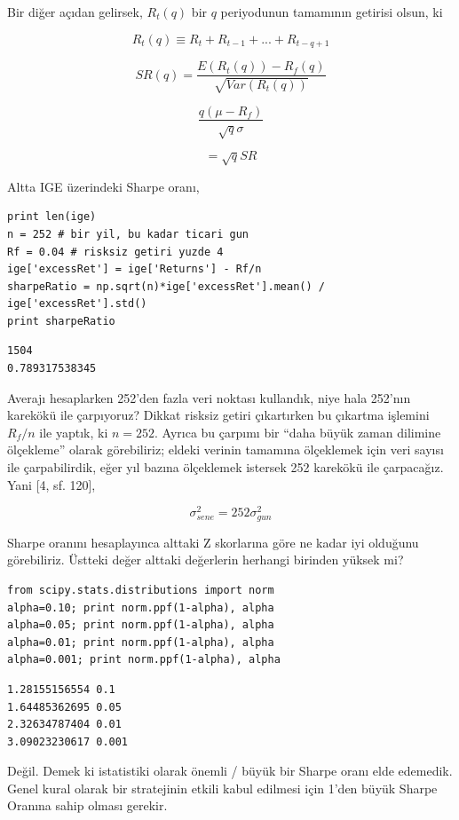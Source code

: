 \documentclass[12pt,fleqn]{article}\usepackage{../../common}
\begin{document}
Bir diğer açıdan gelirsek,  $R_t(q)$ bir $q$ periyodunun tamamının getirisi
olsun, ki

$$ R_t(q) \equiv R_t + R_{t-1} + ... + R_{t-q+1}  $$

$$ SR(q) = \frac{E(R_t(q)) - R_f(q)}{\sqrt{Var(R_t(q))}} $$

$$ \frac{q(\mu-R_f)}{\sqrt{q} \sigma} $$

$$ = \sqrt{q}SR $$

Altta IGE üzerindeki Sharpe oranı,

\begin{verbatim}
print len(ige)
n = 252 # bir yil, bu kadar ticari gun
Rf = 0.04 # risksiz getiri yuzde 4
ige['excessRet'] = ige['Returns'] - Rf/n
sharpeRatio = np.sqrt(n)*ige['excessRet'].mean() / ige['excessRet'].std()
print sharpeRatio
\end{verbatim}

\begin{verbatim}
1504
0.789317538345
\end{verbatim}

Averajı hesaplarken 252'den fazla veri noktası kullandık, niye hala 252'nın
karekökü ile çarpıyoruz? Dikkat risksiz getiri çıkartırken bu çıkartma
işlemini $R_f/n$ ile yaptık, ki $n=252$. Ayrıca bu çarpımı bir ``daha büyük
zaman dilimine ölçekleme'' olarak görebiliriz; eldeki verinin tamamına
ölçeklemek için veri sayısı ile çarpabilirdik, eğer yıl bazına ölçeklemek
istersek 252 karekökü ile çarpacağız. Yani [4, sf. 120], 

$$ \sigma_{sene}^2 = 252 \sigma_{gun}^2 $$

Sharpe oranını hesaplayınca alttaki Z skorlarına göre ne kadar iyi olduğunu
görebiliriz. Üstteki değer alttaki değerlerin herhangi birinden yüksek mi?

\begin{verbatim}
from scipy.stats.distributions import norm
alpha=0.10; print norm.ppf(1-alpha), alpha
alpha=0.05; print norm.ppf(1-alpha), alpha
alpha=0.01; print norm.ppf(1-alpha), alpha
alpha=0.001; print norm.ppf(1-alpha), alpha
\end{verbatim}

\begin{verbatim}
1.28155156554 0.1
1.64485362695 0.05
2.32634787404 0.01
3.09023230617 0.001
\end{verbatim}

Değil. Demek ki istatistiki olarak önemli / büyük bir Sharpe oranı elde
edemedik. Genel kural olarak bir stratejinin etkili kabul edilmesi için
1'den büyük Sharpe Oranına sahip olması gerekir. 
\end{document}
